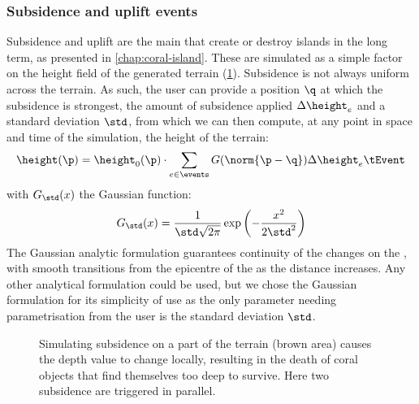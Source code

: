 \subsubsection{Subsidence and uplift events}
Subsidence and uplift are the main  that create or destroy islands in the long term, as presented in \cref{chap:coral-island}. These  are simulated as a simple factor on the height field of the generated terrain (\cref{fig:env-obj-subsidence-event}). Subsidence is not always uniform across the terrain. As such, the user can provide a position $\q$ at which the subsidence is strongest, the amount of subsidence applied $\Delta \height_e$ and a standard deviation $\std$, from which we can then compute, at any point in space and time of the simulation, the height of the terrain:
\begin{align*}
    \height(\p) = \height_0(\p) \cdot \sum_{e \in \events}{G(\norm{\p - \q})} \Delta \height_e \tEvent
\end{align*}
with $G_{\std}(x)$ the Gaussian function:
\begin{align}
    G_{\std}(x) = \frac{1}{\std \sqrt{2\pi}} \exp \left(-\frac {x^{2}}{2 \std ^{2}}\right)
\end{align}
The Gaussian analytic formulation guarantees continuity of the changes on the , with smooth transitions from the epicentre of the  as the distance increases. Any other analytical formulation could be used, but we chose the Gaussian formulation for its simplicity of use as the only parameter needing parametrisation from the user is the standard deviation $\std$.

\begin{figure}
    \caption{Simulating subsidence on a part of the terrain (brown area) causes the depth value to change locally, resulting in the death of coral objects that find themselves too deep to survive. Here two subsidence  are triggered in parallel.}
    \label{fig:env-obj-subsidence-event}
\end{figure}

